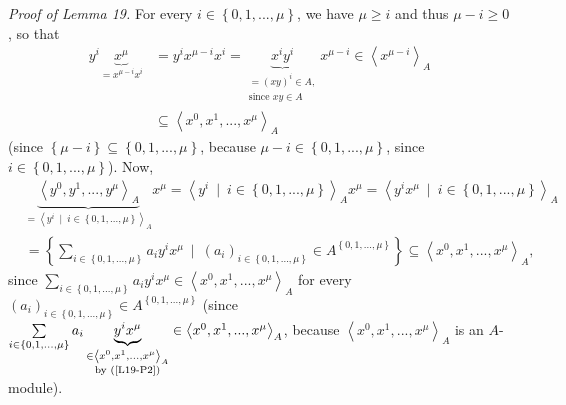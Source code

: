 \documentclass[12pt,final,notitlepage,onecolumn]{article}%
\begin{document}
\textit{Proof of Lemma 19.} For every $i\in\left\{  0,1,...,\mu\right\}  $, we
have $\mu\geq i$ and thus $\mu-i\geq0$, so that%
\begin{align}
y^{i}\underbrace{x^{\mu}}_{=x^{\mu-i}x^{i}}  &  =y^{i}x^{\mu-i}x^{i}%
=\underbrace{x^{i}y^{i}}_{\substack{=\left(  xy\right)  ^{i}\in
A,\\\text{since }xy\in A}}x^{\mu-i}\in\left\langle x^{\mu-i}\right\rangle
_{A}\label{L19-P1}\\
&  \subseteq\left\langle x^{0},x^{1},...,x^{\mu}\right\rangle _{A}
\label{L19-P2}%
\end{align}
(since $\left\{  \mu-i\right\}  \subseteq\left\{  0,1,...,\mu\right\}  $,
because $\mu-i\in\left\{  0,1,...,\mu\right\}  $, since $i\in\left\{
0,1,...,\mu\right\}  $). Now,%
\begin{align}
&  \underbrace{\left\langle y^{0},y^{1},...,y^{\mu}\right\rangle _{A}%
}_{=\left\langle y^{i}\ \mid\ i\in\left\{  0,1,...,\mu\right\}  \right\rangle
_{A}}x^{\mu}=\left\langle y^{i}\ \mid\ i\in\left\{  0,1,...,\mu\right\}
\right\rangle _{A}x^{\mu}=\left\langle y^{i}x^{\mu}\ \mid\ i\in\left\{
0,1,...,\mu\right\}  \right\rangle _{A}\nonumber\\
&  =\left\{  \sum\limits_{i\in\left\{  0,1,...,\mu\right\}  }a_{i}y^{i}x^{\mu
}\ \mid\ \left(  a_{i}\right)  _{i\in\left\{  0,1,...,\mu\right\}  }\in
A^{\left\{  0,1,...,\mu\right\}  }\right\}  \subseteq\left\langle x^{0}%
,x^{1},...,x^{\mu}\right\rangle _{A}, \label{L19-Pa}%
\end{align}
since $\sum\limits_{i\in\left\{  0,1,...,\mu\right\}  }a_{i}y^{i}x^{\mu}%
\in\left\langle x^{0},x^{1},...,x^{\mu}\right\rangle _{A}$ for every $\left(
a_{i}\right)  _{i\in\left\{  0,1,...,\mu\right\}  }\in A^{\left\{
0,1,...,\mu\right\}  }$ (since $\sum\limits_{i\in\left\{  0,1,...,\mu\right\}
}a_{i}\underbrace{y^{i}x^{\mu}}_{\substack{\in\left\langle x^{0}%
,x^{1},...,x^{\mu}\right\rangle _{A}\\\text{by (\ref{L19-P2})}}}\in
\left\langle x^{0},x^{1},...,x^{\mu}\right\rangle _{A}$, because $\left\langle
x^{0},x^{1},...,x^{\mu}\right\rangle _{A}$ is an $A$-module).
\end{document}
